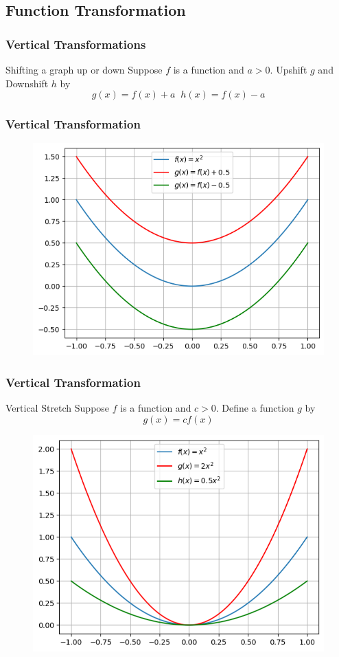 \documentclass{beamer}
\begin{document}
\subsection{Function Transformation}
\begin{frame}
  \frametitle{Vertical Transformations}

  \begin{block}{Shifting a graph up or down}
    Suppose \(f \) is a function and \(a > 0\). Upshift \(g\) and  Downshift \(h\) by
\[g(x) = f (x) + a \;\; h(x) = f (x) - a \]
  \end{block}
  \frametitle{Vertical Transformation}
  \begin{figure}[h]    
    \centering
    \includegraphics[scale=0.4]{vertical_shift.png}
    \end{figure}
\end{frame}
\begin{frame}
  \frametitle{Vertical Transformation}
  \begin{block}{Vertical Stretch}
    Suppose \(f\) is a function and \(c > 0\). Define a function \(g\) by
\[g(x) = c f (x)\]
  \end{block}
  \begin{figure}[h]    
    \centering
    \includegraphics[scale=0.5]{vertical_stretch.png}
    \end{figure}
\end{frame}
\end{document}

